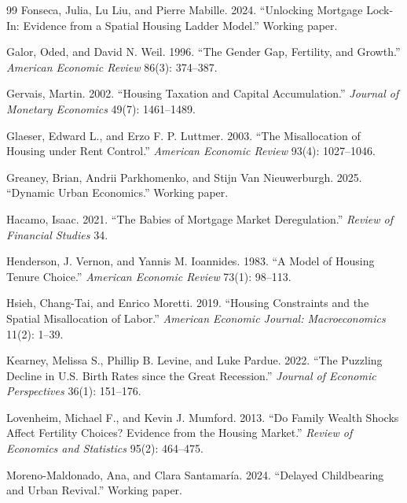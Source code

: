 \documentclass[11pt]{article}
\newcommand{\1}{\mathbf 1}
\begin{document}
\begin{thebibliography}{99}
Fonseca, Julia, Lu Liu, and Pierre Mabille. 2024. ``Unlocking Mortgage Lock-In: Evidence from a Spatial Housing Ladder Model.'' Working paper.

Galor, Oded, and David N. Weil. 1996. ``The Gender Gap, Fertility, and Growth.'' \emph{American Economic Review} 86(3): 374--387.

Gervais, Martin. 2002. ``Housing Taxation and Capital Accumulation.'' \emph{Journal of Monetary Economics} 49(7): 1461--1489.

Glaeser, Edward L., and Erzo F. P. Luttmer. 2003. ``The Misallocation of Housing under Rent Control.'' \emph{American Economic Review} 93(4): 1027--1046.

Greaney, Brian, Andrii Parkhomenko, and Stijn Van Nieuwerburgh. 2025. ``Dynamic Urban Economics.'' Working paper.

Hacamo, Isaac. 2021. ``The Babies of Mortgage Market Deregulation.'' \emph{Review of Financial Studies} 34.

Henderson, J. Vernon, and Yannis M. Ioannides. 1983. ``A Model of Housing Tenure Choice.'' \emph{American Economic Review} 73(1): 98--113.

Hsieh, Chang-Tai, and Enrico Moretti. 2019. ``Housing Constraints and the Spatial Misallocation of Labor.'' \emph{American Economic Journal: Macroeconomics} 11(2): 1--39.

Kearney, Melissa S., Phillip B. Levine, and Luke Pardue. 2022. ``The Puzzling Decline in U.S. Birth Rates since the Great Recession.'' \emph{Journal of Economic Perspectives} 36(1): 151--176.

Lovenheim, Michael F., and Kevin J. Mumford. 2013. ``Do Family Wealth Shocks Affect Fertility Choices? Evidence from the Housing Market.'' \emph{Review of Economics and Statistics} 95(2): 464--475.

Moreno-Maldonado, Ana, and Clara Santamar\'ia. 2024. ``Delayed Childbearing and Urban Revival.'' Working paper.


\end{thebibliography}
\end{document}
